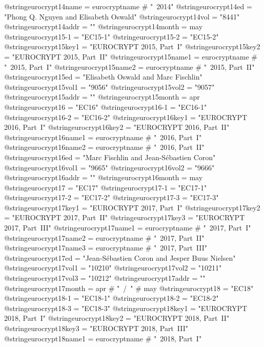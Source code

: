 @string{eurocrypt14name =       eurocryptname # "~2014"}
@string{eurocrypt14ed =         "Phong Q. Nguyen and Elisabeth Oswald"}
@string{eurocrypt14vol =        "8441"}
@string{eurocrypt14addr =       ""}
@string{eurocrypt14month =      may}
@string{eurocrypt15-1 =         "EC15-1"}
@string{eurocrypt15-2 =         "EC15-2"}
@string{eurocrypt15key1 =       "EUROCRYPT 2015, Part~I"}
@string{eurocrypt15key2 =       "EUROCRYPT 2015, Part~II"}
@string{eurocrypt15name1 =      eurocryptname # "~2015, Part~I"}
@string{eurocrypt15name2 =      eurocryptname # "~2015, Part~II"}
@string{eurocrypt15ed =         "Elisabeth Oswald and Marc Fischlin"}
@string{eurocrypt15vol1 =       "9056"}
@string{eurocrypt15vol2 =       "9057"}
@string{eurocrypt15addr =       ""}
@string{eurocrypt15month =      apr}
@string{eurocrypt16 =           "EC16"}
@string{eurocrypt16-1 =         "EC16-1"}
@string{eurocrypt16-2 =         "EC16-2"}
@string{eurocrypt16key1 =       "EUROCRYPT 2016, Part~I"}
@string{eurocrypt16key2 =       "EUROCRYPT 2016, Part~II"}
@string{eurocrypt16name1 =      eurocryptname # "~2016, Part~I"}
@string{eurocrypt16name2 =      eurocryptname # "~2016, Part~II"}
@string{eurocrypt16ed =         "Marc Fischlin and Jean-S{\'{e}}bastien Coron"}
@string{eurocrypt16vol1 =       "9665"}
@string{eurocrypt16vol2 =       "9666"}
@string{eurocrypt16addr =       ""}
@string{eurocrypt16month =      may}
@string{eurocrypt17 =           "EC17"}
@string{eurocrypt17-1 =         "EC17-1"}
@string{eurocrypt17-2 =         "EC17-2"}
@string{eurocrypt17-3 =         "EC17-3"}
@string{eurocrypt17key1 =       "EUROCRYPT 2017, Part~I"}
@string{eurocrypt17key2 =       "EUROCRYPT 2017, Part~II"}
@string{eurocrypt17key3 =       "EUROCRYPT 2017, Part~III"}
@string{eurocrypt17name1 =      eurocryptname # "~2017, Part~I"}
@string{eurocrypt17name2 =      eurocryptname # "~2017, Part~II"}
@string{eurocrypt17name3 =      eurocryptname # "~2017, Part~III"}
@string{eurocrypt17ed =         "Jean-S{\'{e}}bastien Coron and Jesper Buus Nielsen"}
@string{eurocrypt17vol1 =       "10210"}
@string{eurocrypt17vol2 =       "10211"}
@string{eurocrypt17vol3 =       "10212"}
@string{eurocrypt17addr =       ""}
@string{eurocrypt17month =      apr # "~/~" # may}
@string{eurocrypt18 =           "EC18"}
@string{eurocrypt18-1 =         "EC18-1"}
@string{eurocrypt18-2 =         "EC18-2"}
@string{eurocrypt18-3 =         "EC18-3"}
@string{eurocrypt18key1 =       "EUROCRYPT 2018, Part~I"}
@string{eurocrypt18key2 =       "EUROCRYPT 2018, Part~II"}
@string{eurocrypt18key3 =       "EUROCRYPT 2018, Part~III"}
@string{eurocrypt18name1 =      eurocryptname # "~2018, Part~I"}
